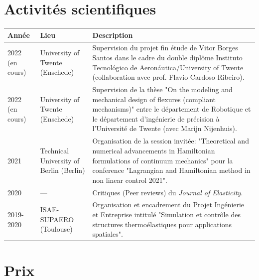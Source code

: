 \documentclass[12pt,a4paper,sans]{moderncv} %
\begin{document}
\section{Activités scientifiques}
\addtolength{\tabcolsep}{6pt}    
\begin{tabular}{p{}p{}p{}}
	Année & Lieu & Description  \\
	\hline
	2022 (en cours) & University of Twente (Enschede) & Supervision du projet fin étude de Vitor Borges Santos dans le cadre du double diplôme Instituto Tecnológico de Aeronáutica/University of Twente (collaboration avec prof. Flavio Cardoso Ribeiro). \\
	2022 (en cours) & University of Twente (Enschede) & Supervision de la thèse "On the modeling and mechanical design of flexures (compliant mechanisms)" entre le département de Robotique et le département d'ingénierie de précision à l'Université de Twente (avec Marijn Nijenhuis). \\
	\hline
	2021  & Technical University of Berlin (Berlin) & Organisation de la session invitée: "Theoretical and numerical advancements in Hamiltonian formulations of continuum mechanics" pour la conference "Lagrangian and Hamiltonian method in non linear control 2021". \\
	\hline
	2020 & --- & Critiques (Peer reviews) du \textit{Journal of Elasticity}. \\
	\hline
	2019-2020 & ISAE-SUPAERO (Toulouse) & Organisation et encadrement du Projet Ingénierie et Entreprise intitulé "Simulation et contrôle des structures thermoélastiques pour
	applications spatiales". \\
	\hline
\end{tabular}
\addtolength{\tabcolsep}{-2pt}


\vspace{5mm}

\section{Prix}


\end{document}
